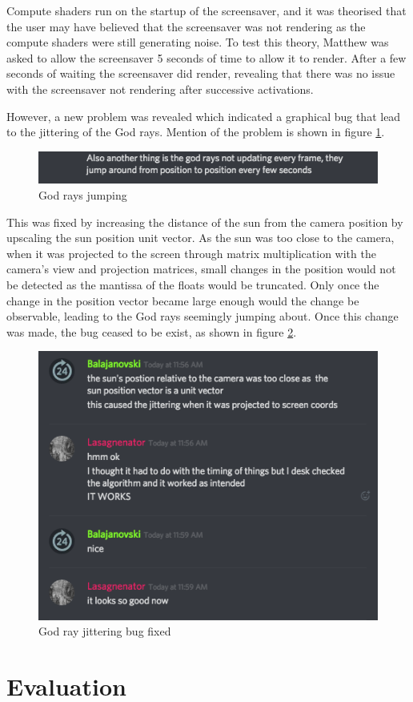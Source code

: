 \documentclass[10pt, openany]{book}
\begin{document}
Compute shaders run on the startup of the screensaver, and it was theorised that the user may have believed that the screensaver was not rendering as the compute shaders were still generating noise. To test this theory, Matthew was asked to allow the screensaver 5 seconds of time to allow it to render. After a few seconds of waiting the screensaver did render, revealing that there was no issue with the screensaver not rendering after successive activations.

However, a new problem was revealed which indicated a graphical bug that lead to the jittering of the God rays. Mention of the problem is shown in figure \ref{fig:broken-rays}.

\begin{figure}[H]
	\centering
	\includegraphics[width=0.5\linewidth]{testing3}
	\caption{God rays jumping}
	\label{fig:broken-rays}
\end{figure}

This was fixed by increasing the distance of the sun from the camera position by upscaling the sun position unit vector. As the sun was too close to the camera, when it was projected to the screen through matrix multiplication with the camera's view and projection matrices, small changes in the position would not be detected as the mantissa of the floats would be truncated. Only once the change in the position vector became large enough would the change be observable, leading to the God rays seemingly jumping about. Once this change was made, the bug ceased to be exist, as shown in figure \ref{fig:fixed}.

\begin{figure}[H]
	\centering
	\includegraphics[width=0.5\linewidth]{testing4}
	\caption{God ray jittering bug fixed}
	\label{fig:fixed}
\end{figure}

\chapter{Evaluation}
\end{document}

